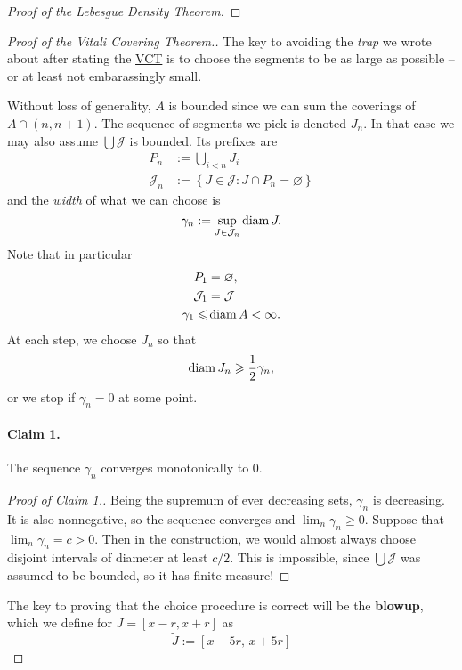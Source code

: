 \begin{proof}[Proof of the Lebesgue Density Theorem]
\end{proof}

\begin{proof}[Proof of the Vitali Covering Theorem.]
    The key to avoiding the \emph{trap} we wrote about after stating the \hyperlink{VitaliCoveringTheorem}{VCT} is to choose the segments to be as large as possible -- or at least not embarassingly small.

    Without loss of generality, \( A \) is bounded since we can sum the coverings of \( A \cap (n,n+1) \). The sequence of segments we pick is denoted \( J_n \). In that case we may also assume \( \bigcup \mathcal{J} \) is bounded. Its prefixes are
    \begin{align*}
        P_n &:= \bigcup_{i < n} J_i \\
        \mathcal{J}_n &:= \left\{ J \in \mathcal{J} : J \cap P_n = \varnothing \right\}
    \end{align*}
   and the \emph{width} of what we can choose is
    \[ 
        \gamma_n := \sup_{J \in \mathcal{J}_n} \operatorname{diam} J.
    \]
    Note that in particular
    \begin{align*}
        P_1 &= \varnothing, \\
        \mathcal{J}_1 &= \mathcal{J} \\
        \gamma_1 \leqslant &\operatorname{diam} A < \infty.
    \end{align*}
    At each step, we choose \( J_n \) so that
    \[ 
       \operatorname{diam} J_n \geqslant \frac{1}{2}\gamma_n,
   \]
   or we stop if \( \gamma_n = 0 \) at some point.
\paragraph{Claim 1.} The sequence \( \gamma_n \) converges monotonically to \( 0 \).
\begin{proof}[Proof of Claim 1.] Being the supremum of ever decreasing sets, \( \gamma_n \) is decreasing. It is also nonnegative, so the sequence converges and \( \lim_n \gamma_n \geqslant 0 \). Suppose that \( \lim_n \gamma_n = c > 0 \). Then in the construction, we would almost always choose disjoint intervals of diameter at least \( c/2 \). This is impossible, since \( \bigcup \mathcal{J} \) was assumed to be bounded, so it has finite measure!
\end{proof}

   The key to proving that the choice procedure is correct will be the \textbf{blowup}, which we define for \( J = [x-r,x+r] \) as
   \[ 
       \widetilde{J} :=  [x - 5r,\, x + 5r]
  \]

\end{proof}
